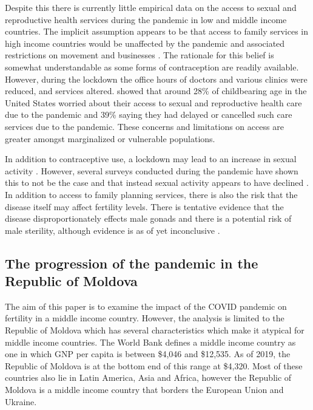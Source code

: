 \documentclass[10pt,letterpaper]{article}
\begin{document}
Despite this there is currently little empirical data on the access to sexual and reproductive health services during the pandemic in low and middle income countries. The implicit assumption appears to be that access to family services in high income countries would be unaffected by the pandemic and associated restrictions on movement and businesses \cite{aassve2020covid}\cite{luppi2020impact}. The rationale for this belief is somewhat understandable as some forms of contraception are readily available. However, during the lockdown the office hours of doctors and various clinics were reduced, and services altered. \cite{lindberg2020early} showed that around 28\% of childbearing age in the United States worried about their access to sexual and reproductive health care due to the pandemic and 39\% saying they had delayed or cancelled such care services due to the pandemic. These concerns and limitations on access are greater amongst marginalized or vulnerable populations.

In addition to contraceptive use, a lockdown may lead to an increase in sexual activity \cite{matchan2020americans}. However, several surveys conducted during the pandemic have shown this to not be the case and that instead sexual activity appears to have declined \cite{jacob2020covid}. In addition to access to family planning services, there is also the risk that the disease itself may affect fertility levels. There is tentative evidence that the disease disproportionately effects male gonads and there is a potential risk of male sterility, although evidence is as of yet inconclusive \cite{jirge2020resuming}. 

\subsection*{The progression of the pandemic in the Republic of Moldova}

The aim of this paper is to examine the impact of the COVID pandemic on fertility in a middle income country. However, the analysis is limited to the Republic of Moldova which has several characteristics which make it atypical for middle income countries. The World Bank defines a middle income country as one in which GNP per capita is between \$4,046 and \$12,535. As of 2019, the Republic of Moldova is at the bottom end of this range at \$4,320. Most of these countries also  lie in Latin America, Asia and Africa, however the Republic of Moldova is a middle income country that borders the European Union and Ukraine. 
\end{document}
